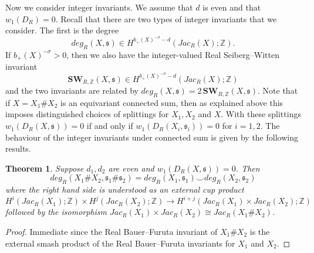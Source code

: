 \documentclass{amsart}
\newtheorem{theorem}{Theorem}[section]
\theoremstyle{definition}
\theoremstyle{remark}
\numberwithin{equation}{section}
\begin{document}
Now we consider integer invariants. We assume that $d$ is even and that $w_1(D_R) = 0$. Recall that there are two types of integer invariants that we consider. The first is the degree
\[
deg_R(X,\mathfrak{s}) \in H^{b_+(X)^{-\sigma}-d}(Jac_R(X) ; \mathbb{Z}).
\]
If $b_+(X)^{-\sigma} > 0$, then we also have the integer-valued Real Seiberg--Witten invariant
\[
\mathbf{SW}_{R,\mathbb{Z}}(X,\mathfrak{s}) \in H^{b_+(X)^{-\sigma}-d}( Jac_R(X) ; \mathbb{Z})
\]
and the two invariants are related by $deg_R(X,\mathfrak{s}) = 2 \, \mathbf{SW}_{R,\mathbb{Z}}(X,\mathfrak{s})$. Note that if $X = X_1 \# X_2$ is an equivariant connected sum, then as explained above this imposes distinguished choices of splittings for $X_1,X_2$ and $X$. With these splittings $w_1(D_R(X,\mathfrak{s})) = 0$ if and only if $w_1(D_R(X_i , \mathfrak{s}_i)) = 0$ for $i=1,2$. The behaviour of the integer invariants under connected sum is given by the following results.
\begin{theorem}\label{thm:glue1}
Suppose $d_1,d_2$ are even and $w_1( D_R(X,\mathfrak{s})) = 0$. Then
\[
deg_R(X_1 \# X_2 , \mathfrak{s}_1 \# \mathfrak{s}_2) = deg_R(X_1 ,\mathfrak{s}_1) \smallsmile deg_R(X_2 , \mathfrak{s}_2)
\]
where the right hand side is understood as an external cup product
\[
H^i( Jac_R(X_1) ; \mathbb{Z}) \times H^j( Jac_R(X_2) ; \mathbb{Z}) \to H^{i+j}(Jac_R(X_1) \times Jac_R(X_2) ; \mathbb{Z})
\]
followed by the isomorphism $Jac_R(X_1) \times Jac_R(X_2) \cong Jac_R(X_1 \# X_2)$.
\end{theorem}
\begin{proof}
Immediate since the Real Bauer--Furuta invariant of $X_1 \# X_2$ is the external smash product of the Real Bauer--Furuta invariants for $X_1$ and $X_2$.
\end{proof}
\end{document}
